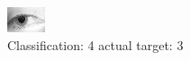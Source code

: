 \begin{figure}[h!]
\begin{center}
\includegraphics[width=0.60\columnwidth]{figures/ID1321_class_4_target_3.png}
\end{center}
\caption{ Classification: 4 actual target: 3}
\label{fig:ID1321_class_4_target_3}
\end{figure}
